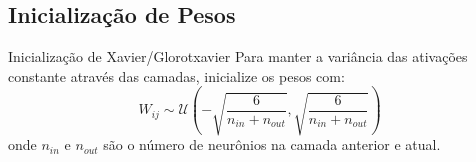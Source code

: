 \documentclass[a4paper,12pt]{article}
\begin{document}
\subsection{Inicialização de Pesos}

\begin{teorema}{Inicialização de Xavier/Glorot}{xavier}
Para manter a variância das ativações constante através das camadas, inicialize os pesos com:
\[
W_{ij} \sim \mathcal{U}\left(-\sqrt{\frac{6}{n_{in} + n_{out}}}, \sqrt{\frac{6}{n_{in} + n_{out}}}\right)
\]
onde $n_{in}$ e $n_{out}$ são o número de neurônios na camada anterior e atual.
\end{teorema}
\end{document}

